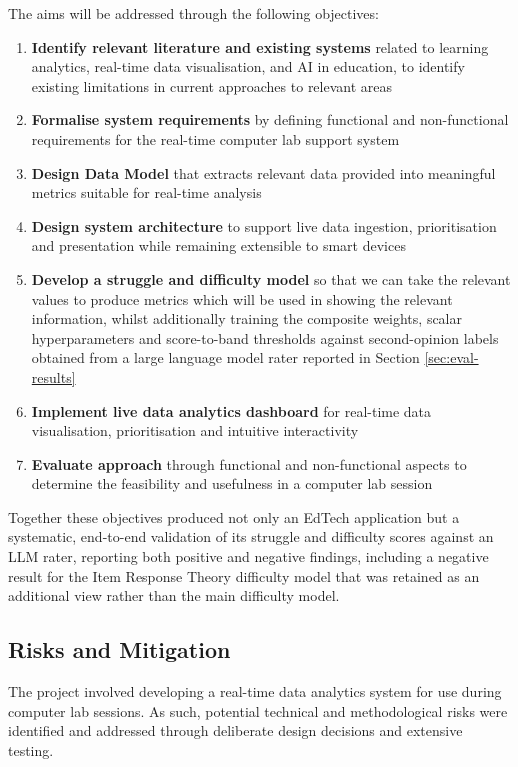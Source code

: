 The aims will be addressed through the following objectives:
\begin{enumerate}
    \item \textbf{Identify relevant literature and existing systems} related to learning analytics, real-time data visualisation, and AI in education, to identify existing limitations in current approaches to relevant areas
    \item \textbf{Formalise system requirements} by defining functional and non-functional requirements for the real-time computer lab support system
    \item \textbf{Design Data Model} that extracts relevant data provided into meaningful metrics suitable for real-time analysis
    \item \textbf{Design system architecture} to support live data ingestion, prioritisation and presentation while remaining extensible to smart devices
    \item \textbf{Develop a struggle and difficulty model} so that we can take the relevant values to produce metrics which will be used in showing the relevant information, whilst additionally training the composite weights, scalar hyperparameters and score-to-band thresholds against second-opinion labels obtained from a large language model rater reported in Section \ref{sec:eval-results}
    \item \textbf{Implement live data analytics dashboard} for real-time data visualisation, prioritisation and intuitive interactivity
    \item \textbf{Evaluate approach} through functional and non-functional aspects to determine the feasibility and usefulness in a computer lab session
\end{enumerate}

Together these objectives produced not only an EdTech application but a systematic, end-to-end validation of its struggle and difficulty scores against an LLM rater, reporting both positive and negative findings, including a negative result for the Item Response Theory difficulty model that was retained as an additional view rather than the main difficulty model.

\subsection{Risks and Mitigation}

The project involved developing a real-time data analytics system for use during computer lab sessions. As such, potential technical and methodological risks were identified and addressed through deliberate design decisions and extensive testing.

